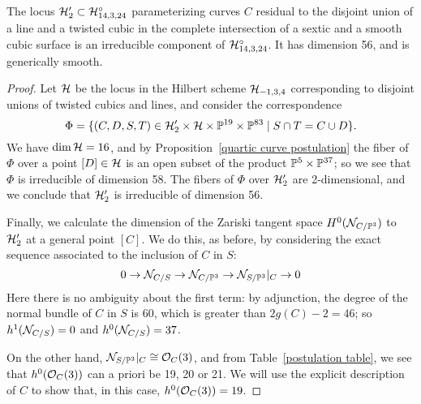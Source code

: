 \begin{proposition}\label{non-mumford}
The locus $\cH_{2}' \subset \cH^\circ_{14,3,24}$ parameterizing curves $C$ residual to the disjoint union of a line and a twisted cubic  in the complete intersection of a sextic and a smooth cubic surface is an irreducible component of  $\cH^\circ_{14,3,24}$. It has dimension 56, and is generically smooth.
\end{proposition} 
 
\begin{proof}
Let $\cH$ be the locus in the Hilbert scheme $\cH_{-1, 3, 4}$ corresponding to disjoint unions of twisted cubics and lines, and consider the correspondence
$$
\Phi = \{(C,D,S,T) \in \cH_{2}' \times \cH \times \PP^{19} \times \PP^{83} \mid S \cap T = C \cup D \}.
$$
We have $\dim \cH = 16$, and  by Proposition~\ref{quartic curve postulation} the fiber of $\Phi$ over a point $[D] \in \cH$ is an open subset of the product $\PP^5 \times \PP^{37}$;  so we see that $\Phi$ is irreducible of dimension 58. The fibers of $\Phi$ over $ \cH_{2}'$ are 2-dimensional, and we conclude that $\cH_{2}'$ is irreducible of dimension 56.

Finally, we calculate the dimension of the Zariski tangent space $H^0(\cN_{C/\PP^3})$ to $\cH_{2}'$ at a general point $[C]$. We do this, as before, by considering the exact sequence associated to the inclusion of $C$ in $S$:
$$
0 \to \cN_{C/S} \to \cN_{C/\PP^3} \to \cN_{S/\PP^3}|_C \to 0
$$ 
Here there is no ambiguity about the first term: by adjunction, the degree of the normal bundle of $C$ in $S$
is 60, which is greater than $2g(C) - 2 = 46$; so $h^1(\cN_{C/S}) = 0$ and $h^0(\cN_{C/S}) = 37$.

On the other hand, $\cN_{S/\PP^3}|_C \cong \cO_C(3)$, and from Table~\ref{postulation table}, we see that $h^0( \cO_C(3))$ can a priori be 19, 20 or 21. We will use the explicit description of $C$ to show that,  in this case, $h^0(\cO_C(3))=19$.


\end{proof}
